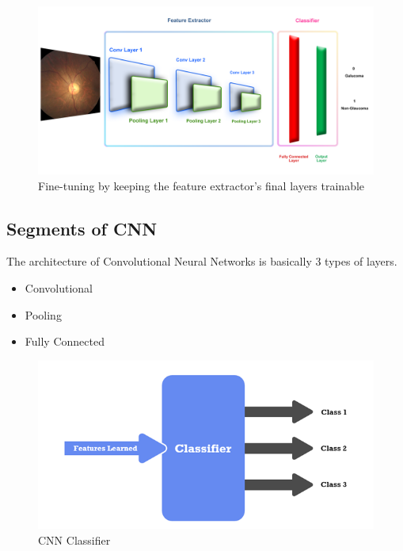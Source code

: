 \vspace{5mm}
\begin{figure}[hbt!]
\centering
\includegraphics[scale=0.4]{images/Fine-tuning by keeping the feature extractor_s final layers trainable.png}
\caption{Fine-tuning by keeping the feature extractor's final layers trainable}
\label{fig:x Fine-tuning by keeping the feature extractor's final layers trainable}
\end{figure}

\newpage
\subsection{Segments of CNN}

\vspace{5mm}
The architecture of Convolutional Neural Networks is basically 3 types of layers.

\begin{itemize}
    \item Convolutional
    \item Pooling
    \item Fully Connected
\end{itemize}

\vspace{5mm}
\begin{figure}[hbt!]
\centering
\includegraphics[scale=1]{images/fig-17.png}
\caption{CNN Classifier}
\label{fig:x CNN Classifier}
\end{figure}

